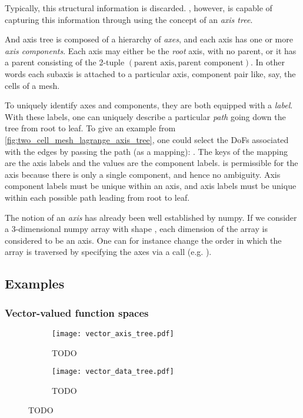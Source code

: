 \documentclass[thesis]{subfiles}
\begin{document}
Typically, this structural information is discarded.
, however, is capable of capturing this information through using the concept of an \textit{axis tree}.

And axis tree is composed of a hierarchy of \textit{axes}, and each axis has one or more \textit{axis components}.
Each axis may either be the \textit{root} axis, with no parent, or it has a parent consisting of the 2-tuple $(\textrm{parent axis}, \textrm{parent component})$.
In other words each subaxis is attached to a particular axis, component pair like, say, the cells of a mesh.

To uniquely identify axes and components, they are both equipped with a \textit{label}.
With these labels, one can uniquely describe a particular \textit{path} going down the tree from root to leaf.
To give an example from \cref{fig:two_cell_mesh_lagrange_axis_tree}, one could select the DoFs associated with the edges by passing the path (as a mapping): .
The keys of the mapping are the axis labels and the values are the component labels.
 is permissible for the  axis because there is only a single component, and hence no ambiguity.
Axis component labels must be unique within an axis, and axis labels must be unique within each possible path leading from root to leaf.

The notion of an \textit{axis} has already been well established by numpy.
If we consider a 3-dimensional numpy array with shape , each dimension of the array is considered to be an axis.
One can for instance change the order in which the array is traversed by specifying the axes via a  call (e.g. ).

\subsection{Examples}

\subsubsection{Vector-valued function spaces}

\begin{figure}
  \centering
  \begin{subfigure}{\textwidth}
    \centering
    \texttt{[image: vector\_axis\_tree.pdf]}
    \caption{TODO}
    \label{fig:vector_axis_tree}
  \end{subfigure}
  \begin{subfigure}{\textwidth}
    \centering
    \texttt{[image: vector\_data\_tree.pdf]}
    \caption{TODO}
    \label{fig:vector_data_tree}
  \end{subfigure}
  \caption{TODO}
  \label{fig:vector_axis_data_tree}
\end{figure}
\end{document}
